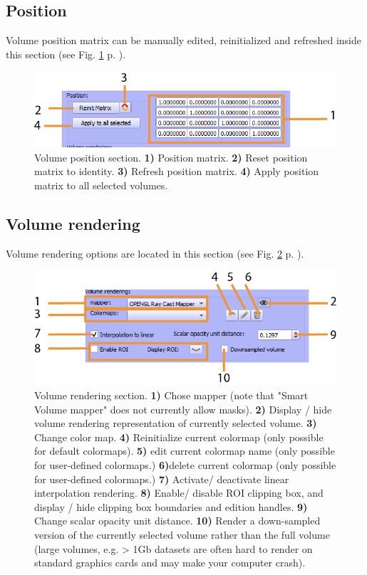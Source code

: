 \subsection{Position}
Volume position matrix can be manually edited, reinitialized and refreshed inside this section (see Fig. \ref{volume_position} p. \pageref{volume_position}).
\begin{figure}
  \centering
  \includegraphics[scale=1]{images/14/volume_position2.png}
\caption{Volume position section. \textbf{1)} Position matrix.   \textbf{2)} Reset position matrix to identity. \textbf{3)} Refresh position matrix.  \textbf{4)} Apply position matrix to all selected volumes. }	
\label{volume_position}
 \end{figure}



\subsection{Volume rendering}
Volume rendering options are located in this section (see Fig. \ref{volume_rendering} p. \pageref{volume_rendering}).
\begin{figure}
  \centering
  \includegraphics[scale=1]{images/14/volume_rendering2.png}
\caption{Volume rendering section. \textbf{1)} Chose mapper (note that "Smart Volume mapper" does not currently allow masks).   \textbf{2)} Display / hide volume rendering representation of currently selected volume. \textbf{3)} Change color map.  \textbf{4)} Reinitialize current colormap (only possible for default colormaps). \textbf{5)} edit current colormap name (only possible for user-defined colormaps.) \textbf{6)}delete current colormap (only possible for user-defined colormaps.) \textbf{7)} Activate/ deactivate linear interpolation rendering. \textbf{8)} Enable/ disable ROI clipping box, and display / hide clipping box boundaries and edition handles.  \textbf{9)} Change scalar opacity unit distance. \textbf{10)} Render a down-sampled version of the currently selected volume rather than the full volume (large volumes, e.g. > 1Gb datasets are often hard to render on standard graphics cards and may make your computer crash).  }	
\label{volume_rendering}
 \end{figure}

